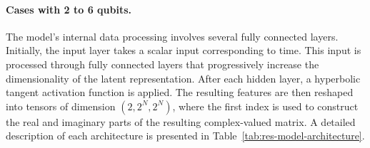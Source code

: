 \paragraph{Cases with 2 to 6 qubits.}
The model's internal data processing involves several fully connected layers. Initially, the input layer takes a scalar input corresponding to time. This input is processed through fully connected layers that progressively increase the dimensionality of the latent representation. After each hidden layer, a hyperbolic tangent activation function is applied. The resulting features are then reshaped into tensors of dimension $(2, 2^N, 2^N)$, where the first index is used to construct the real and imaginary parts of the resulting complex-valued matrix. A detailed description of each architecture is presented in Table~\ref{tab:res-model-architecture}.


